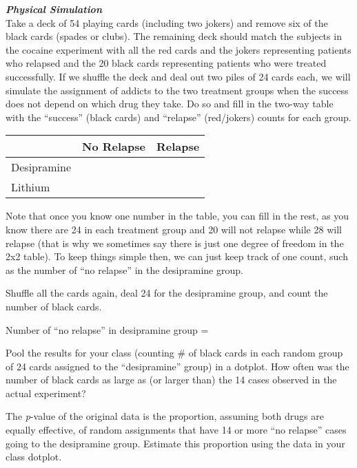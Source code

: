 \noindent\textbf{\textit{Physical Simulation}}\\
\vspace{3pt}
Take a deck of 54 playing cards (including two jokers) and remove six of the black cards (spades or clubs).  The remaining deck should match the subjects in the cocaine experiment with all the red cards and the jokers representing patients who relapsed and the 20 black cards representing patients who were treated successfully.  If we shuffle the deck and deal out two piles of 24 cards each, we will simulate the assignment of addicts to the two treatment groups when the success does not depend on which drug they take. Do so and fill in the two-way table with the ``success'' (black cards) and ``relapse'' (red/jokers) counts for each group.

\begin{table}[!ht]
\begin{center}
\begin{tabular}{|l|c|c|}
\hline
& No Relapse & Relapse\\
\hline
Desipramine &  &  \\
\hline
Lithium &  & \\
\hline
\end{tabular}
\end{center}
\end{table}

Note that once you know one number in the table, you can fill in the rest, as you know there are 24 in each treatment group and 20 will not relapse while 28 will relapse (that is why we sometimes say there is just one degree of freedom in the 2x2 table).  To keep things simple then, we can just keep track of one count, such as the number of ``no relapse'' in the desipramine group. 

Shuffle all the cards again, deal 24 for the desipramine group, and count the number of black cards. 

\begin{center}
Number of ``no relapse'' in desipramine group = \underline{\hspace{.5in}}
\end{center}

Pool the results for your class (counting \# of black cards in each random group of 24 cards assigned to the ``desipramine'' group) in a dotplot.  How often was the number of black cards as large as (or larger than) the 14 cases observed in the actual experiment? 

The \textit{p}-value of the original data is the proportion, assuming both drugs are equally effective, of random assignments that have 14 or more ``no relapse'' cases going to the desipramine group.  Estimate this proportion using the data in your class dotplot. \\
\vspace{12pt}

